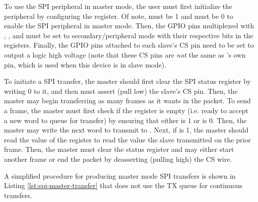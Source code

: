 To use the SPI peripheral in master mode, the user must first initialize the  peripheral by configuring the  register. Of note,  must be 1 and  must be 0 to enable the SPI peripheral in master mode. Then, the GPIO pins multiplexed with , , and  must be set to secondary/peripheral mode with their respective bits in the  registers. Finally, the GPIO pins attached to each slave's CS pin need to be set to output a logic high voltage (note that these CS pins are \textit{not} the same as 's own  pin, which is used when this device is in slave mode).

To initiate a SPI transfer, the master should first clear the SPI status register  by writing 0 to it, and then must assert (pull low) the slave's CS pin. Then, the master may begin transferring as many frames as it wants in the packet. To send a frame, the master must first check if the  register is empty (i.e. ready to accept a new word to queue for transfer) by ensuring that either  is 1 or  is 0. Then, the master may write the next word to transmit to . Next, if  is 1, the master should read the value of the  register to read the value the slave transmitted on the prior frame. Then, the master must clear the status register and may either start another frame or end the packet by deasserting (pulling high) the CS wire.

A simplified procedure for producing master mode SPI transfers is shown in Listing \ref{lst:spi-master-transfer} that does not use the TX queue for continuous transfers.

